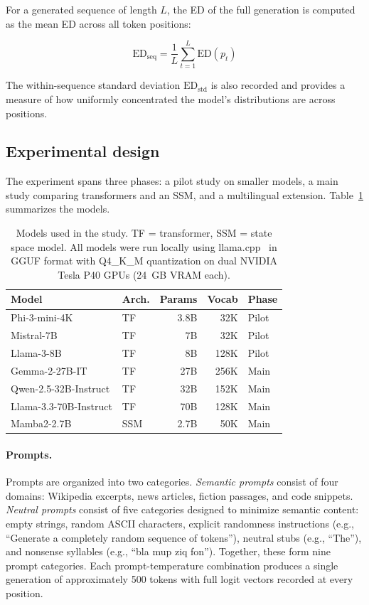 \documentclass{article}
\newcommand{\ED}{\mathrm{ED}}
\begin{document}
For a generated sequence of length $L$, the ED of the full generation is computed as the mean ED across all token positions:

\begin{equation}
\ED_{\text{seq}} = \frac{1}{L} \sum_{t=1}^{L} \ED(p_t)
\end{equation}

\noindent The within-sequence standard deviation $\ED_{\text{std}}$ is also recorded and provides a measure of how uniformly concentrated the model's distributions are across positions.

\subsection{Experimental design}

The experiment spans three phases: a pilot study on smaller models, a main study comparing transformers and an SSM, and a multilingual extension. Table~\ref{tab:models} summarizes the models.

\begin{table}[t]
\centering
\small
\begin{tabular}{llrrl}
\toprule
\textbf{Model} & \textbf{Arch.} & \textbf{Params} & \textbf{Vocab} & \textbf{Phase} \\
\midrule
Phi-3-mini-4K & TF & 3.8B & 32K & Pilot \\
Mistral-7B & TF & 7B & 32K & Pilot \\
Llama-3-8B & TF & 8B & 128K & Pilot \\
\midrule
Gemma-2-27B-IT & TF & 27B & 256K & Main \\
Qwen-2.5-32B-Instruct & TF & 32B & 152K & Main \\
Llama-3.3-70B-Instruct & TF & 70B & 128K & Main \\
\midrule
Mamba2-2.7B & SSM & 2.7B & 50K & Main \\
\bottomrule
\end{tabular}
\caption{Models used in the study. TF = transformer, SSM = state space model. All models were run locally using llama.cpp~\citep{llama_cpp} in GGUF format with Q4\_K\_M quantization on dual NVIDIA Tesla P40 GPUs (24~GB VRAM each).}
\label{tab:models}
\end{table}

\paragraph{Prompts.}
Prompts are organized into two categories. \emph{Semantic prompts} consist of four domains: Wikipedia excerpts, news articles, fiction passages, and code snippets. \emph{Neutral prompts} consist of five categories designed to minimize semantic content: empty strings, random ASCII characters, explicit randomness instructions (e.g., ``Generate a completely random sequence of tokens''), neutral stubs (e.g., ``The''), and nonsense syllables (e.g., ``bla mup ziq fon''). Together, these form nine prompt categories. Each prompt-temperature combination produces a single generation of approximately 500 tokens with full logit vectors recorded at every position.
\end{document}
